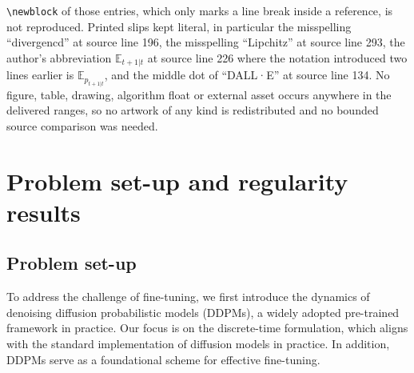 \documentclass[10pt,a4paper]{amsart}
\newcommand{\E}{\mathbb{E}}
\begin{document}
\texttt{\textbackslash newblock} of those entries, which only marks a line break inside a reference, is not reproduced. Printed slips kept literal, in particular the misspelling ``divergencd'' at source line 196, the misspelling ``Lipchitz'' at source line 293, the author's abbreviation $\E_{t+1\vert t}$ at source line 226 where the notation introduced two lines earlier is $\E_{p_{t+1\vert t}}$, and the middle dot of ``DALL·E'' at source line 134. No figure, table, drawing, algorithm float or external asset occurs anywhere in the delivered ranges, so no artwork of any kind is redistributed and no bounded source comparison was needed.
\section{Problem set-up and regularity results}
\label{sec:set-up}


\subsection{Problem set-up}
To address the challenge of fine-tuning, we first introduce the dynamics of denoising diffusion probabilistic models (DDPMs), a widely adopted pre-trained framework in practice. Our focus is on the discrete-time formulation, which aligns with the standard implementation of diffusion models in practice. In addition, DDPMs serve as a foundational scheme for effective fine-tuning.
\end{document}
